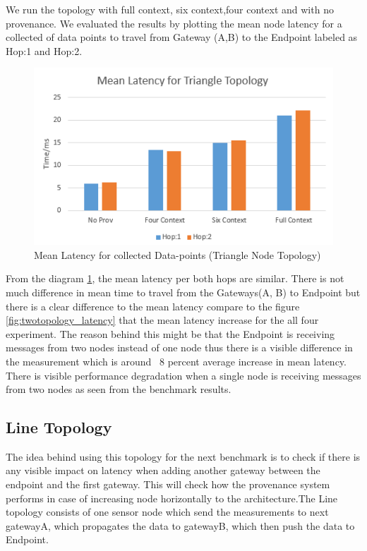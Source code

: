 We run the topology with full context, six context,four context and with no provenance. We evaluated the results by plotting the mean node latency for a collected of data points
to travel from Gateway (A,B) to the Endpoint labeled as Hop:1  and Hop:2.
\begin{figure}[H]
	\center
	\includegraphics[width=\textwidth]{figures/triangletopology_latency.PNG}
	\caption{Mean Latency for collected Data-points  (Triangle Node Topology)}
	\label{fig:triangletopology_latency}
\end{figure}


From the diagram \ref{fig:triangletopology_latency}, the mean latency per both hops are similar. There is not much difference in mean time to travel from the Gateways(A, B) to Endpoint but there is a clear difference to the mean latency compare to the figure \ref{fig:twotopology_latency} that the mean latency increase for the all four experiment. The reason behind this might be that the Endpoint is receiving messages from two nodes instead of one node thus there is a visible difference in the measurement which is around ~8 percent average increase in mean latency. There is visible performance degradation when a single node is receiving messages from two nodes as seen from the benchmark results.

\subsection{Line Topology}
The idea behind using this topology for the next benchmark is to check if there is any visible impact on latency when adding another gateway between the endpoint and the first gateway. This will check how the provenance system performs in case of increasing node horizontally to the architecture.The Line topology consists of one sensor node which send the measurements to next gatewayA, which propagates the data to gatewayB, which then push the data to Endpoint. 

